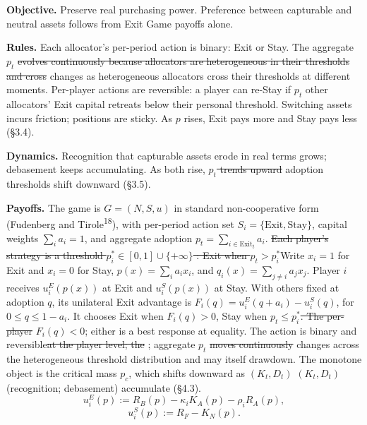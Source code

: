 \documentclass[12pt]{article}
\theoremstyle{definition}
\theoremstyle{remark}
\providecommand{\DIFaddtex}[1]{{\color{AddedText}#1}}
\providecommand{\DIFdeltex}[1]{{\color{DeletedText}\sout{#1}}}
\providecommand{\DIFaddbegin}{}
\providecommand{\DIFaddend}{}
\providecommand{\DIFdelbegin}{}
\providecommand{\DIFdelend}{}
\providecommand{\DIFadd}[1]{\texorpdfstring{\DIFaddtex{#1}}{#1}} %
\providecommand{\DIFdel}[1]{\texorpdfstring{\DIFdeltex{#1}}{}} %
\begin{document}
\smallskip
\noindent\textbf{Objective.} Preserve real purchasing power. Preference between capturable and neutral assets follows from Exit Game payoffs alone.

\smallskip
\noindent\textbf{Rules.} Each allocator's per-period action is binary: Exit or Stay. The aggregate $p_t$ \DIFdelbegin \DIFdel{evolves continuously because allocators are heterogeneous in their thresholds and cross }\DIFdelend \DIFaddbegin \DIFadd{changes as heterogeneous allocators cross their thresholds }\DIFaddend at different moments. Per-player actions are reversible: a player can re-Stay if \DIFdelbegin \DIFdel{$p_t$ }\DIFdelend \DIFaddbegin \DIFadd{other allocators' Exit capital }\DIFaddend retreats below their personal threshold. Switching assets incurs friction; positions are sticky. As $p$ rises, Exit pays more and Stay pays less (\S3.4).

\smallskip
\noindent\textbf{Dynamics.} Recognition that capturable assets erode in real terms grows; debasement keeps accumulating. As both rise, \DIFdelbegin \DIFdel{$p_t$ trends upward }\DIFdelend \DIFaddbegin \DIFadd{adoption thresholds shift downward }\DIFaddend (\S3.5).

\smallskip
\noindent\textbf{Payoffs.} The game is $G = (N, S, u)$ in standard non-cooperative form (Fudenberg and Tirole\textsuperscript{18}), with per-period action set $S_i = \{\text{Exit}, \text{Stay}\}$, capital weights $\sum_i a_i = 1$, and aggregate adoption $p_t = \sum_{i \in \text{Exit}_t} a_i$. \DIFdelbegin \DIFdel{Each player's strategy is a threshold $p_i^* \in [0, 1] \cup \{+\infty\}$ : Exit when $p_t > p_i^*$}\DIFdelend \DIFaddbegin \DIFadd{Write $x_i=1$ for Exit and $x_i=0$ for Stay, $p(x)=\sum_i a_i x_i$, and $q_i(x)=\sum_{j\ne i}a_jx_j$. Player $i$ receives $u_i^E(p(x))$ at Exit and $u_i^S(p(x))$ at Stay. With others fixed at adoption $q$, its unilateral Exit advantage is $F_i(q)=u_i^E(q+a_i)-u_i^S(q)$, for $0\le q\le1-a_i$. It chooses Exit when $F_i(q)>0$}\DIFaddend , Stay when \DIFdelbegin \DIFdel{$p_t \le p_i^*$. The per-player }\DIFdelend \DIFaddbegin \DIFadd{$F_i(q)<0$; either is a best response at equality. The }\DIFaddend action is binary and reversible\DIFdelbegin \DIFdel{at the player level; the }\DIFdelend \DIFaddbegin \DIFadd{; }\DIFaddend aggregate $p_t$ \DIFdelbegin \DIFdel{moves continuously }\DIFdelend \DIFaddbegin \DIFadd{changes }\DIFaddend across the heterogeneous threshold distribution and may itself drawdown. The monotone object is the critical mass $p_c$, which shifts downward as \DIFdelbegin \DIFdel{$(K_t, D_t)$ }\DIFdelend \DIFaddbegin \DIFadd{$(K_t,D_t)$ }\DIFaddend (recognition; debasement) accumulate (\S4.3).
\[
u_i^E(p) := R_B(p) - \kappa_i K_A(p) - \rho_i R_A(p),
\]
\[
u_i^S(p) := R_F - K_N(p).
\]
\end{document}
